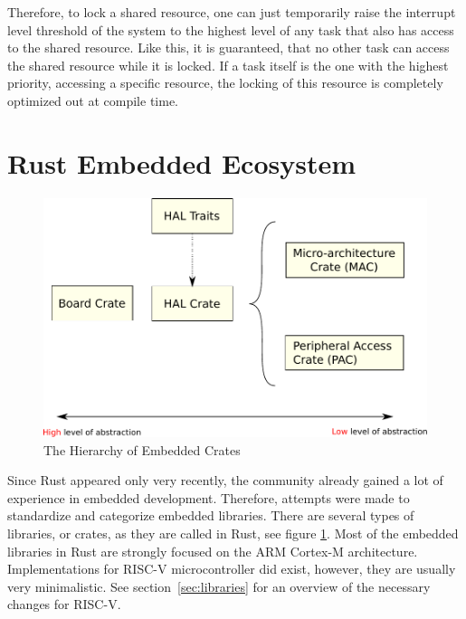 Therefore, to lock a shared resource, one can just temporarily raise the interrupt level threshold of the system to the highest level of any task that also has access to the shared resource. Like this, it is guaranteed, that no other task can access the shared resource while it is locked.
If a task itself is the one with the highest priority, accessing a specific resource, the locking of this resource is completely optimized out at compile time.

\section{Rust Embedded Ecosystem}

\begin{figure}
  \centerfloat
  \includegraphics[width=\textwidth]{fig/crate_hierarchy.pdf}
  \caption{The Hierarchy of Embedded Crates}%
  \label{fig:embedded_crates}
\end{figure}

Since Rust appeared only very recently, the community already gained a lot of experience in embedded development.
Therefore, attempts were made to standardize and categorize embedded libraries.
There are several types of libraries, or crates, as they are called in Rust, see figure \ref{fig:embedded_crates}.
Most of the embedded libraries in Rust are strongly focused on the ARM Cortex-M architecture. Implementations for RISC-V microcontroller did exist, however, they are usually very minimalistic. See section~\ref{sec:libraries} for an overview of the necessary changes for RISC-V.

